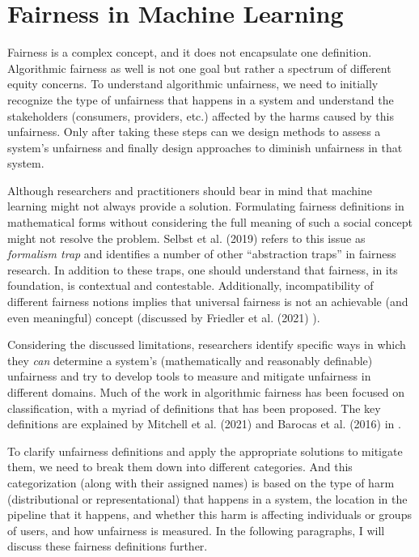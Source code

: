 \section{Fairness in Machine Learning}
\label{sec:fair_ml}
    
    Fairness is a complex concept, and it does not encapsulate one definition. Algorithmic fairness as well is not one goal but rather a spectrum of different equity concerns. To understand algorithmic unfairness, we need to initially recognize the type of unfairness that happens in a system and understand the stakeholders (consumers, providers, etc.) affected by the harms caused by this unfairness. Only after taking these steps can we design methods to assess a system's unfairness and finally design approaches to diminish unfairness in that system.
    
    Although researchers and practitioners should bear in mind that machine learning might not always provide a solution. Formulating fairness definitions in mathematical forms without considering the full meaning of such a social concept might not resolve the problem. Selbst et al. (2019) \cite{selbst2019fairness} refers to this issue as \textit{formalism trap} and identifies a number of other ``abstraction traps'' in fairness research. In addition to these traps, one should understand that fairness, in its foundation, is contextual and contestable. Additionally, incompatibility of different fairness notions implies that universal fairness is not an achievable (and even meaningful) concept (discussed by Friedler et al. (2021) \cite{friedler-impossibility-2021}).
    
    Considering the discussed limitations, researchers identify specific ways in which they \textit{can} determine a system's (mathematically and reasonably definable) unfairness and try to develop tools to measure and mitigate unfairness in different domains. Much of the work in algorithmic fairness has been focused on classification, with a myriad of definitions that has been proposed. The key definitions are explained by Mitchell et al. (2021) and Barocas et al. (2016) in \cite{mitchell2021algorithmic,barocas2016big,barocas2018fairness}.
    
    To clarify unfairness definitions and apply the appropriate solutions to mitigate them, we need to break them down into different categories. And this categorization (along with their assigned names) is based on the type of harm (distributional or representational) that happens in a system, the location in the pipeline that it happens, and whether this harm is affecting individuals or groups of users, and how unfairness is measured. In the following paragraphs, I will discuss these fairness definitions further.

